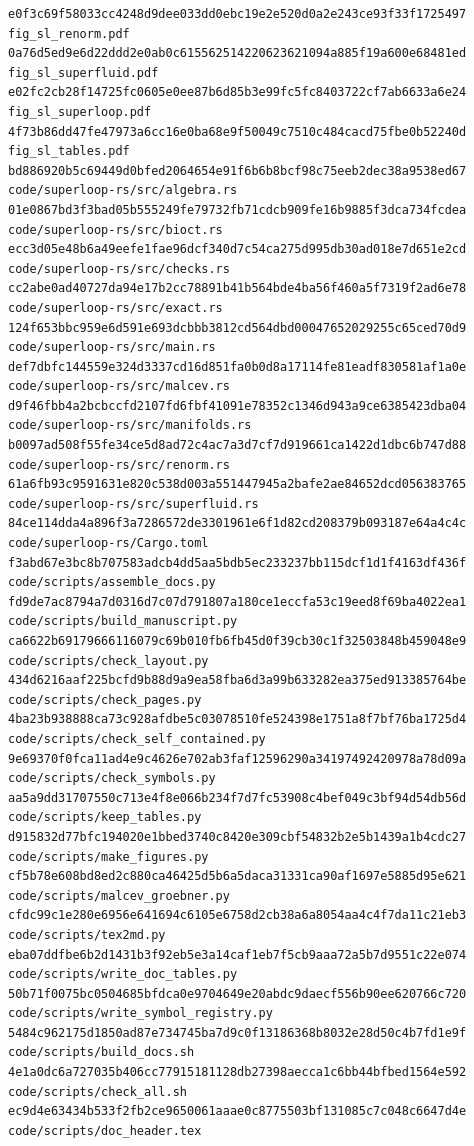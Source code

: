 \documentclass[
  10pt,
]{article}
\begin{document}
\begin{verbatim}
e0f3c69f58033cc4248d9dee033dd0ebc19e2e520d0a2e243ce93f33f1725497  fig_sl_renorm.pdf
0a76d5ed9e6d22ddd2e0ab0c615562514220623621094a885f19a600e68481ed  fig_sl_superfluid.pdf
e02fc2cb28f14725fc0605e0ee87b6d85b3e99fc5fc8403722cf7ab6633a6e24  fig_sl_superloop.pdf
4f73b86dd47fe47973a6cc16e0ba68e9f50049c7510c484cacd75fbe0b52240d  fig_sl_tables.pdf
bd886920b5c69449d0bfed2064654e91f6b6b8bcf98c75eeb2dec38a9538ed67  code/superloop-rs/src/algebra.rs
01e0867bd3f3bad05b555249fe79732fb71cdcb909fe16b9885f3dca734fcdea  code/superloop-rs/src/bioct.rs
ecc3d05e48b6a49eefe1fae96dcf340d7c54ca275d995db30ad018e7d651e2cd  code/superloop-rs/src/checks.rs
cc2abe0ad40727da94e17b2cc78891b41b564bde4ba56f460a5f7319f2ad6e78  code/superloop-rs/src/exact.rs
124f653bbc959e6d591e693dcbbb3812cd564dbd00047652029255c65ced70d9  code/superloop-rs/src/main.rs
def7dbfc144559e324d3337cd16d851fa0b0d8a17114fe81eadf830581af1a0e  code/superloop-rs/src/malcev.rs
d9f46fbb4a2bcbccfd2107fd6fbf41091e78352c1346d943a9ce6385423dba04  code/superloop-rs/src/manifolds.rs
b0097ad508f55fe34ce5d8ad72c4ac7a3d7cf7d919661ca1422d1dbc6b747d88  code/superloop-rs/src/renorm.rs
61a6fb93c9591631e820c538d003a551447945a2bafe2ae84652dcd056383765  code/superloop-rs/src/superfluid.rs
84ce114dda4a896f3a7286572de3301961e6f1d82cd208379b093187e64a4c4c  code/superloop-rs/Cargo.toml
f3abd67e3bc8b707583adcb4dd5aa5bdb5ec233237bb115dcf1d1f4163df436f  code/scripts/assemble_docs.py
fd9de7ac8794a7d0316d7c07d791807a180ce1eccfa53c19eed8f69ba4022ea1  code/scripts/build_manuscript.py
ca6622b69179666116079c69b010fb6fb45d0f39cb30c1f32503848b459048e9  code/scripts/check_layout.py
434d6216aaf225bcfd9b88d9a9ea58fba6d3a99b633282ea375ed913385764be  code/scripts/check_pages.py
4ba23b938888ca73c928afdbe5c03078510fe524398e1751a8f7bf76ba1725d4  code/scripts/check_self_contained.py
9e69370f0fca11ad4e9c4626e702ab3faf12596290a34197492420978a78d09a  code/scripts/check_symbols.py
aa5a9dd31707550c713e4f8e066b234f7d7fc53908c4bef049c3bf94d54db56d  code/scripts/keep_tables.py
d915832d77bfc194020e1bbed3740c8420e309cbf54832b2e5b1439a1b4cdc27  code/scripts/make_figures.py
cf5b78e608bd8ed2c880ca46425d5b6a5daca31331ca90af1697e5885d95e621  code/scripts/malcev_groebner.py
cfdc99c1e280e6956e641694c6105e6758d2cb38a6a8054aa4c4f7da11c21eb3  code/scripts/tex2md.py
eba07ddfbe6b2d1431b3f92eb5e3a14caf1eb7f5cb9aaa72a5b7d9551c22e074  code/scripts/write_doc_tables.py
50b71f0075bc0504685bfdca0e9704649e20abdc9daecf556b90ee620766c720  code/scripts/write_symbol_registry.py
5484c962175d1850ad87e734745ba7d9c0f13186368b8032e28d50c4b7fd1e9f  code/scripts/build_docs.sh
4e1a0dc6a727035b406cc77915181128db27398aecca1c6bb44bfbed1564e592  code/scripts/check_all.sh
ec9d4e63434b533f2fb2ce9650061aaae0c8775503bf131085c7c048c6647d4e  code/scripts/doc_header.tex
\end{verbatim}
\end{document}

